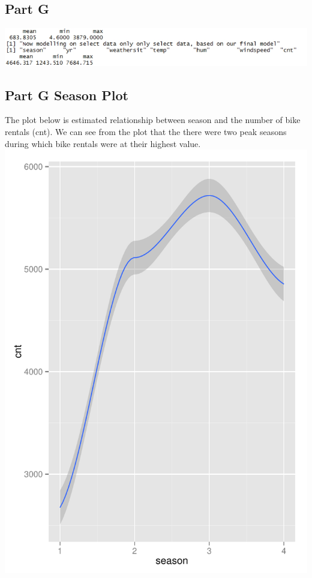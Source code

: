 \documentclass[11pt]{article}
\begin{document}
\subsection{Part G}
\label{subsec:problem2goutput}
\includegraphics[width=\textwidth]{OutputPartG.jpg}
\pagebreak
\subsection{Part G Season Plot}
\label{subsec:problem2gplotsSeason}
The plot below is estimated relationship between season and the number of bike rentals (cnt). We can see from the plot that the there were two peak seasons during which bike rentals were at their highest value. \newline 
\includegraphics{Problem2G-Season.pdf}
\pagebreak
\end{document}
